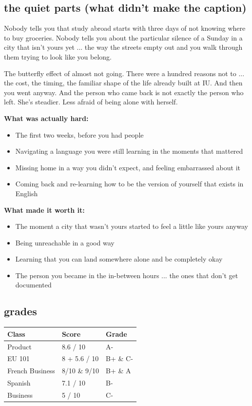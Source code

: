 \documentclass[12pt, letterpaper]{article}
\begin{document}
\subsection{the quiet parts (what didn't make the caption)}

Nobody tells you that study abroad starts with three days of not knowing where to buy groceries. Nobody tells you about the particular silence of a Sunday in a city that isn't yours yet ... the way the streets empty out and you walk through them trying to look like you belong.

The butterfly effect of almost not going. There were a hundred reasons not to ... the cost, the timing, the familiar shape of the life already built at IU. And then you went anyway. And the person who came back is not exactly the person who left. She's steadier. Less afraid of being alone with herself.

\textbf{What was actually hard:}
\begin{itemize}
  \item The first two weeks, before you had people
  \item Navigating a language you were still learning in the moments that mattered
  \item Missing home in a way you didn't expect, and feeling embarrassed about it
  \item Coming back and re-learning how to be the version of yourself that exists in English
\end{itemize}

\textbf{What made it worth it:}
\begin{itemize}
  \item The moment a city that wasn't yours started to feel a little like yours anyway
  \item Being unreachable in a good way
  \item Learning that you can land somewhere alone and be completely okay
  \item The person you became in the in-between hours ... the ones that don't get documented
\end{itemize}

\subsection{grades}

\begin{center}
\begin{tabular}{lll}
\toprule
\textbf{Class} & \textbf{Score} & \textbf{Grade} \\
\midrule
Product & 8.6 / 10 & A- \\
EU 101 & 8 + 5.6 / 10 & B+ \& C- \\
French Business & 8/10 \& 9/10 & B+ \& A \\
Spanish & 7.1 / 10 & B- \\
Business & 5 / 10 & C- \\
\bottomrule
\end{tabular}
\end{center}
\end{document}
